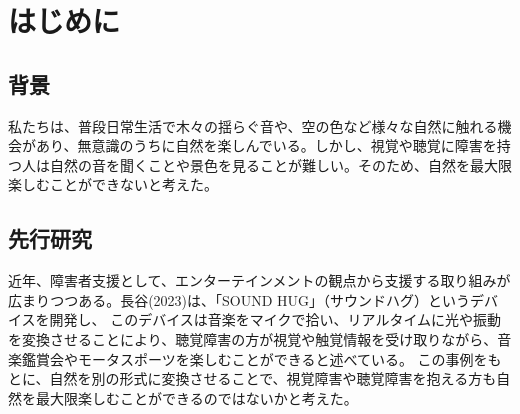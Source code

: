 \tableofcontents
\newpage

\pagestyle{fancy}
\fancyhf{}
\renewcommand{\headrulewidth}{0pt}
\makeatletter
\let\ps@plain\ps@fancy
\makeatother
\setlength{\headsep}{20pt}

\chapter{はじめに}
\section{背景}
\noindent\space
私たちは、普段日常生活で木々の揺らぐ音や、空の色など様々な自然に触れる機会があり、無意識のうちに自然を楽しんでいる。しかし、視覚や聴覚に障害を持つ人は自然の音を聞くことや景色を見ることが難しい。そのため、自然を最大限楽しむことができないと考えた。
\section{先行研究}
近年、障害者支援として、エンターテインメントの観点から支援する取り組みが広まりつつある。長谷(2023)\cite{SOUNDHUG}は、「SOUND HUG」（サウンドハグ）というデバイスを開発し、
このデバイスは⾳楽をマイクで拾い、リアルタイムに光や振動を変換させることにより、聴覚障害の方が視覚や触覚情報を受け取りながら、音楽鑑賞会やモータスポーツを楽しむことができると述べている。
この事例をもとに、自然を別の形式に変換させることで、視覚障害や聴覚障害を抱える方も自然を最大限楽しむことができるのではないかと考えた。

